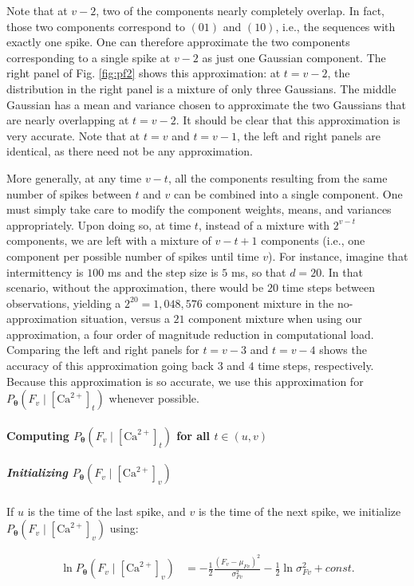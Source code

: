 \documentclass[12pt]{article}
\providecommand{\ve}[1]{\boldsymbol{#1}}
\providecommand{\ve}[1]{\boldsymbol{#1}}
\newcommand{\thetn}{\ve{\theta}}
\newcommand{\p}{P_{\thetn}}
\newcommand{\Ca}{[\text{Ca}^{2+}]}
\begin{document}
Note that at $v-2$, two of the components nearly completely overlap.  In fact, those two components correspond to $(01)$ and $(10)$, i.e., the sequences with exactly one spike.   One can therefore approximate the two components corresponding to a single spike at $v-2$ as just one Gaussian component. The right panel of Fig. \ref{fig:pf2} shows this approximation: at $t=v-2$, the distribution in the right panel is a mixture of only three Gaussians.  The middle Gaussian has a mean and variance chosen to approximate the two Gaussians that are nearly overlapping at $t=v-2$.  It should be clear that this approximation is very accurate.  Note that at $t=v$ and $t=v-1$, the left and right panels are identical, as there need not be any approximation.

More generally, at any time $v-t$, all the components resulting from the same number of spikes between $t$ and $v$ can be combined into a single component.  One must simply take care to modify the component weights, means, and variances appropriately.  Upon doing so, at time $t$, instead of a mixture with $2^{v-t}$ components, we are left with a mixture of $v-t+1$ components (i.e., one component per possible number of spikes until time $v$). For instance, imagine that intermittency is $100$ ms and the step size is $5$ ms, so that $d=20$.  In that scenario, without the approximation, there would be $20$ time steps between observations, yielding a $2^{20}=1,048,576$ component mixture in the no-approximation situation, versus a $21$ component mixture when using our approximation, a four order of magnitude reduction in computational load. Comparing the left and right panels for $t=v-3$ and $t=v-4$ shows the accuracy of this approximation going back $3$ and $4$ time steps, respectively. Because this approximation is so accurate, we use this approximation for $\p(F_v \mid \Ca_t)$ whenever possible.

\paragraph{Computing $\p(F_v \mid \Ca_t)$ for all $t \in (u,v)$}

\subparagraph{Initializing $\p(F_v \mid \Ca_v)$}

If $u$ is the time of the last spike, and $v$ is the time of the next spike, we initialize $\p(F_v \mid \Ca_v)$ using:

\begin{align} \label{eq:obs_lik}
\ln \p(F_v \mid \Ca_v) &= -\frac{1}{2} \frac{(F_v-\mu_{Fv})^2}{\sigma_{Fv}^2} -\frac{1}{2} \ln \sigma_{Fv}^2 +const.
\end{align}
\end{document}
